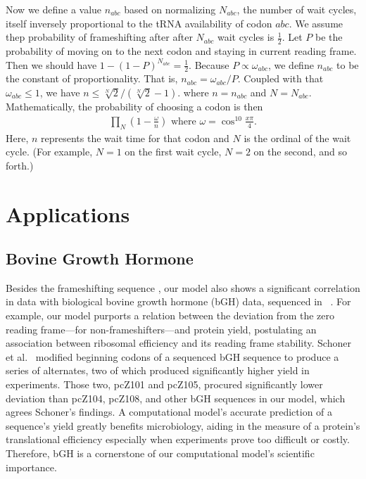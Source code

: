 \documentclass[12pt, draft]{article}
\numberwithin{equation}{section}
\begin{document}
Now we define a value $n_{abc}$ based on normalizing $N_{abc}$, the
number of wait cycles, itself inversely proportional to the
tRNA availability of codon $abc$.
We assume thep probability of frameshifting after
after $N_{abc}$ wait cycles is $\frac{1}{2}$.  Let $P$ be the
probability of moving on to the next codon and staying in current reading
frame.  Then we should have $1-\left(1-P\right)^{N_{abc}} =
\frac{1}{2}$.  Because $P \propto \omega_{abc}$, we define $n_{abc}$ to be the constant of
proportionality. That is, $n_{abc} = \omega_{abc} / P$.  Coupled
with that $\omega_{abc} \le 1$, we have $n \le \sqrt[N]{2}/(\sqrt[N]{2} - 1).$
where $n = n_{abc}$ and $N = N_{abc}$. Mathematically, the probability of choosing a codon is then
\begin{align}
  \prod_N \left(1-\frac{\omega}{n}\right) \text{ where } \omega = \cos^{10}{\frac{x\pi}{4}}.
\end{align}
Here, $n$ represents the wait time for that codon and $N$ is the ordinal of the wait cycle. (For example,
$N=1$ on the first wait cycle, $N=2$ on the second, and so forth.)

\section{Applications}

\subsection{Bovine Growth Hormone}
Besides the frameshifting sequence \prfB, our model also shows a significant correlation in data with biological
bovine growth hormone (bGH) data, sequenced in \ecoli~\cite{schoner:bgh}. For example, our model purports a relation
between the deviation from the zero reading frame---for non-frameshifters---and protein yield, postulating
an association between ribosomal efficiency and its reading frame stability. Schoner et al.~\cite{schoner:bgh}
modified beginning codons of a sequenced bGH sequence to produce a series of alternates,
two of which produced significantly higher yield in experiments. Those two, pcZ101 and pcZ105, procured significantly
lower deviation than pcZ104, pcZ108, and other bGH sequences in our model, which agrees Schoner's findings.
A computational model's accurate prediction of a sequence's yield greatly benefits microbiology,
aiding in the measure of a protein's translational efficiency especially when experiments prove too difficult
or costly. Therefore, bGH is a cornerstone of our computational model's scientific importance.
\end{document}
